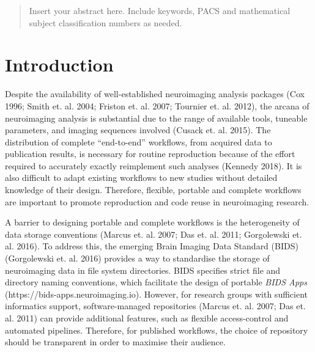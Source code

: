 
\date{Received: date / Accepted: date}


\maketitle

\begin{abstract}
Insert your abstract here. Include keywords, PACS and mathematical
subject classification numbers as needed.
\end{abstract}

\section{Introduction}
\label{intro}

Despite the availability of well-established neuroimaging analysis
packages (Cox 1996; Smith et. al. 2004; Friston et. al. 2007; Tournier
et. al. 2012), the arcana of neuroimaging analysis is substantial due to
the range of available tools, tuneable parameters, and imaging sequences
involved (Cusack et. al. 2015). The distribution of complete
``end-to-end'' workflows, from acquired data to publication results, is
necessary for routine reproduction because of the effort required to
accurately exactly reimplement such analyses (Kennedy 2018). It is also
difficult to adapt existing workflows to new studies without detailed
knowledge of their design. Therefore, flexible, portable and complete
workflows are important to promote reproduction and code reuse in
neuroimaging research.

A barrier to designing portable and complete workflows is the
heterogeneity of data storage conventions (Marcus et. al. 2007; Das et.
al. 2011; Gorgolewski et. al. 2016). To address this, the emerging Brain
Imaging Data Standard (BIDS) (Gorgolewski et. al. 2016) provides a way
to standardise the storage of neuroimaging data in file system
directories. BIDS specifies strict file and directory naming
conventions, which facilitate the design of portable \emph{BIDS Apps}
(https://bids-apps.neuroimaging.io). However, for research groups with
sufficient informatics support, software-managed repositories (Marcus
et. al. 2007; Das et. al. 2011) can provide additional features, such as
flexible access-control and automated pipelines. Therefore, for
published workflows, the choice of repository should be transparent in
order to maximise their audience.

